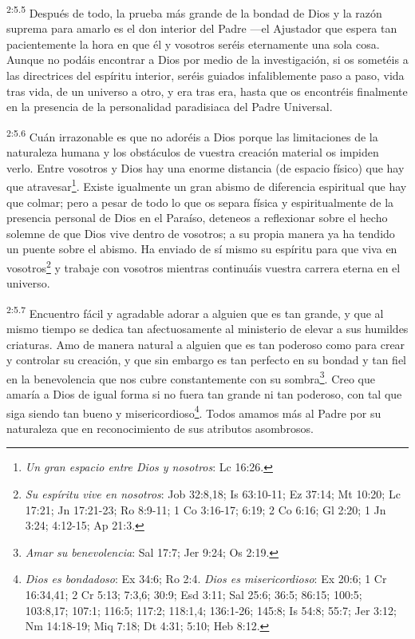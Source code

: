 \par
\textsuperscript{2:5.5} Después de todo, la prueba más grande de la bondad de Dios y la razón suprema para amarlo es el don interior del Padre ---el Ajustador que espera tan pacientemente la hora en que él y vosotros seréis eternamente una sola cosa. Aunque no podáis encontrar a Dios por medio de la investigación, si os sometéis a las directrices del espíritu interior, seréis guiados infaliblemente paso a paso, vida tras vida, de un universo a otro, y era tras era, hasta que os encontréis finalmente en la presencia de la personalidad paradisiaca del Padre Universal.

\par
\textsuperscript{2:5.6} Cuán irrazonable es que no adoréis a Dios porque las limitaciones de la naturaleza humana y los obstáculos de vuestra creación material os impiden verlo. Entre vosotros y Dios hay una enorme distancia (de espacio físico) que hay que atravesar\footnote{\textit{Un gran espacio entre Dios y nosotros}: Lc 16:26.}. Existe igualmente un gran abismo de diferencia espiritual que hay que colmar; pero a pesar de todo lo que os separa física y espiritualmente de la presencia personal de Dios en el Paraíso, deteneos a reflexionar sobre el hecho solemne de que Dios vive dentro de vosotros; a su propia manera ya ha tendido un puente sobre el abismo. Ha enviado de sí mismo su espíritu para que viva en vosotros\footnote{\textit{Su espíritu vive en nosotros}: Job 32:8,18; Is 63:10-11; Ez 37:14; Mt 10:20; Lc 17:21; Jn 17:21-23; Ro 8:9-11; 1 Co 3:16-17; 6:19; 2 Co 6:16; Gl 2:20; 1 Jn 3:24; 4:12-15; Ap 21:3.} y trabaje con vosotros mientras continuáis vuestra carrera eterna en el universo.

\par
\textsuperscript{2:5.7} Encuentro fácil y agradable adorar a alguien que es tan grande, y que al mismo tiempo se dedica tan afectuosamente al ministerio de elevar a sus humildes criaturas. Amo de manera natural a alguien que es tan poderoso como para crear y controlar su creación, y que sin embargo es tan perfecto en su bondad y tan fiel en la benevolencia que nos cubre constantemente con su sombra\footnote{\textit{Amar su benevolencia}: Sal 17:7; Jer 9:24; Os 2:19.}. Creo que amaría a Dios de igual forma si no fuera tan grande ni tan poderoso, con tal que siga siendo tan bueno y misericordioso\footnote{\textit{Dios es bondadoso}: Ex 34:6; Ro 2:4. \textit{Dios es misericordioso}: Ex 20:6; 1 Cr 16:34,41; 2 Cr 5:13; 7:3,6; 30:9; Esd 3:11; Sal 25:6; 36:5; 86:15; 100:5; 103:8,17; 107:1; 116:5; 117:2; 118:1,4; 136:1-26; 145:8; Is 54:8; 55:7; Jer 3:12; Nm 14:18-19; Miq 7:18; Dt 4:31; 5:10; Heb 8:12.}. Todos amamos más al Padre por su naturaleza que en reconocimiento de sus atributos asombrosos.


